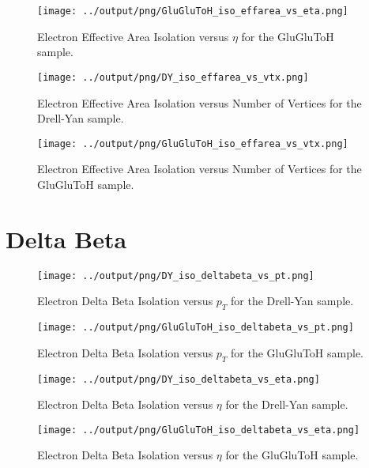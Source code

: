 \documentclass[11pt]{book}
\begin{document}
\begin{figure}[htb]
\centering
\texttt{[image: ../output/png/GluGluToH\_iso\_effarea\_vs\_eta.png]}
\caption{Electron Effective Area Isolation versus $\eta$ for the GluGluToH sample.}
\label{fig:ggh_iso_effarea_vs_eta}
\end{figure}

\begin{figure}[htb]
\centering
\texttt{[image: ../output/png/DY\_iso\_effarea\_vs\_vtx.png]}
\caption{Electron Effective Area Isolation versus Number of Vertices for the Drell-Yan sample.}
\label{fig:dy_iso_effarea_vs_vtx}
\end{figure}

\begin{figure}[htb]
\centering
\texttt{[image: ../output/png/GluGluToH\_iso\_effarea\_vs\_vtx.png]}
\caption{Electron Effective Area Isolation versus Number of Vertices for the GluGluToH sample.}
\label{fig:ggh_iso_effarea_vs_vtx}
\end{figure}
\clearpage


\section{Delta Beta}

\begin{figure}[htb]
\centering
\texttt{[image: ../output/png/DY\_iso\_deltabeta\_vs\_pt.png]}
\caption{Electron Delta Beta Isolation versus $p_{T}$ for the Drell-Yan sample.}
\label{fig:dy_iso_deltabeta_vs_pt}
\end{figure}

\begin{figure}[htb]
\centering
\texttt{[image: ../output/png/GluGluToH\_iso\_deltabeta\_vs\_pt.png]}
\caption{Electron Delta Beta Isolation versus $p_{T}$ for the GluGluToH sample.}
\label{fig:ggh_iso_deltabeta_vs_pt}
\end{figure}

\begin{figure}[htb]
\centering
\texttt{[image: ../output/png/DY\_iso\_deltabeta\_vs\_eta.png]}
\caption{Electron Delta Beta Isolation versus $\eta$ for the Drell-Yan sample.}
\label{fig:dy_iso_deltabeta_vs_eta}
\end{figure}

\begin{figure}[htb]
\centering
\texttt{[image: ../output/png/GluGluToH\_iso\_deltabeta\_vs\_eta.png]}
\caption{Electron Delta Beta Isolation versus $\eta$ for the GluGluToH sample.}
\label{fig:ggh_iso_deltabeta_vs_eta}
\end{figure}
\end{document}
